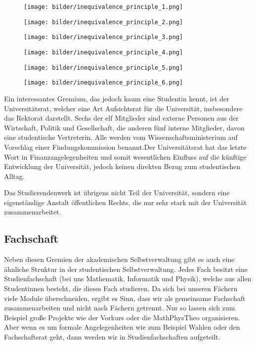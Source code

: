 \begin{figure*}[b]
    \centering
    \begin{subfigure}{.3\textwidth}
	\texttt{[image: bilder/inequivalence\_principle\_1.png]}
	\vspace{7mm}
    \end{subfigure}
    \begin{subfigure}{.3\textwidth}
	\texttt{[image: bilder/inequivalence\_principle\_2.png]}
	\vspace{7mm}
    \end{subfigure}
    \begin{subfigure}{.3\textwidth}
	\texttt{[image: bilder/inequivalence\_principle\_3.png]}
	\vspace{7mm}
    \end{subfigure}
    \begin{subfigure}{.3\textwidth}
	\texttt{[image: bilder/inequivalence\_principle\_4.png]}
    \end{subfigure}
    \begin{subfigure}{.3\textwidth}
	\texttt{[image: bilder/inequivalence\_principle\_5.png]}
    \end{subfigure}
    \begin{subfigure}{.3\textwidth}
	\texttt{[image: bilder/inequivalence\_principle\_6.png]}
    \end{subfigure}
\end{figure*}
Ein interessantes Gremium, das jedoch kaum eine Studentin kennt, ist der Universitätsrat, welcher eine Art Aufsichtsrat für die Universität, insbesondere das Rektorat darstellt. Sechs der elf Mitglieder sind externe Personen aus der Wirtschaft, Politik und Gesellschaft, die anderen fünf interne Mitglieder, davon eine studentische Vertreterin. Alle werden vom Wissenschaftsministerium auf Vorschlag einer Findungskommission benannt.Der Universitätsrat hat das letzte Wort in Finanzangelegenheiten und somit wesentlichen Einfluss auf die künftige Entwicklung der Universität, jedoch keinen direkten Bezug zum studentischen Alltag.



Das Studierendenwerk ist übrigens nicht Teil der Universität, sondern eine eigenständige Anstalt öffentlichen Rechts, die nur sehr stark mit der Universität zusammenarbeitet.

\subsection{Fachschaft}
Neben diesen Gremien der akademischen Selbstverwaltung gibt es auch eine ähnliche Struktur in der studentischen Selbstverwaltung. Jedes Fach besitzt eine Studienfachschaft (bei uns Mathematik, Informatik und Physik), welche aus allen Studentinnen besteht, die dieses Fach studieren. Da sich bei unseren Fächern viele Module überschneiden, ergibt es Sinn, dass wir als gemeinsame Fachschaft zusammenarbeiten und nicht nach Fächern getrennt. Nur so lassen sich zum Beispiel große Projekte wie der Vorkurs oder die MathPhysTheo organisieren. Aber wenn es um formale Angelegenheiten wie zum Beispiel Wahlen oder den Fachschaftsrat geht, dann werden wir in Studienfachschaften aufgeteilt.

